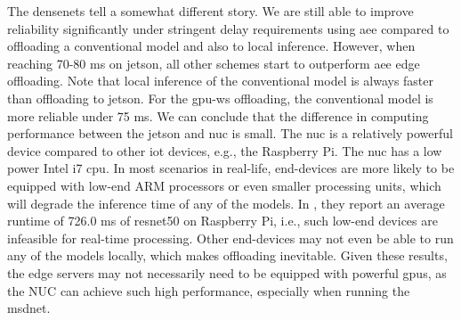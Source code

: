 The \gls{densenet}s tell a somewhat different story. We are still able to improve reliability significantly under stringent delay requirements using \gls{aee} compared to offloading a conventional model and also to local inference. However, when reaching 70-80 ms on \gls{jetson}, all other schemes start to outperform  \gls{aee} edge offloading. Note that local inference of the conventional model is always faster than offloading to \gls{jetson}. For the \gls{gpu-ws} offloading, the conventional model is more reliable under 75 ms. We can conclude that the difference in computing performance between the \gls{jetson} and \gls{nuc} is small. The \gls{nuc} is a relatively powerful device compared to other \gls{iot} devices, e.g., the Raspberry Pi. The \gls{nuc} has a low power Intel i7 \gls{cpu}. In most scenarios in real-life, end-devices are more likely to be equipped with low-end ARM processors or even smaller processing units, which will degrade the inference time of any of the models. In \cite{zheng_apache/incubator-tvm_nodate}, they report an average runtime of 726.0 ms of \gls{resnet}50 on Raspberry Pi, i.e., such low-end devices are infeasible for real-time processing. Other end-devices may not even be able to run any of the models locally, which makes offloading inevitable. Given these results, the edge servers may not necessarily need to be equipped with powerful \gls{gpu}s, as the NUC can achieve such high performance, especially when running the \gls{msdnet}. 

